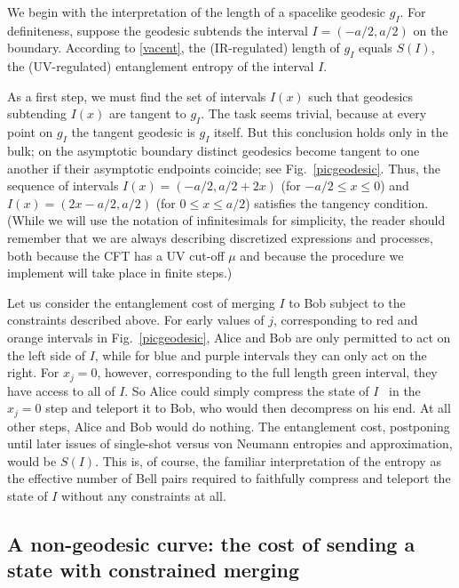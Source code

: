 \documentclass[12pt]{article}
\begin{document}
We begin with the interpretation of the length of a spacelike geodesic $g_I$. For definiteness, suppose the geodesic subtends the interval $I = (-a/2, a/2)$ on the boundary. According to \eqref{vacent}, the (IR-regulated) length of $g_I$ equals $S(I)$, the (UV-regulated) entanglement entropy of the interval $I$.

As a first step, we must find the set of intervals $I(x)$ such that geodesics subtending $I(x)$ are tangent to $g_I$. The task seems trivial, because at every point on $g_I$ the tangent geodesic is $g_I$ itself. But this conclusion holds only in the bulk; on the asymptotic boundary distinct geodesics become tangent to one another if their asymptotic endpoints coincide; see Fig.~\ref{picgeodesic}. Thus, the sequence of intervals $I(x) = (-a/2, a/2 + 2x)$ (for $-a/2 \leq x \leq 0$) and $I(x) = (2x - a/2, a/2)$ (for $0 \leq x \leq a/2$) satisfies the tangency condition. (While we will use the notation of infinitesimals for simplicity, the reader should remember that we are always describing discretized expressions and processes, both because the CFT has a UV cut-off $\mu$ and because the procedure we implement will take place in finite steps.)

Let us consider the entanglement cost of merging $I$ to Bob subject to the constraints described above. For early values of $j$, corresponding to red and orange intervals in Fig.~\ref{picgeodesic}, Alice and Bob are only permitted to act on the left side of $I$, while for blue and purple intervals they can only act on the right. For $x_j =0$, however, corresponding to the full length green interval, they have access to all of $I$. So Alice could simply compress the state of $I$~\cite{schumacher} in the $x_j=0$ step and teleport it to Bob, who would then decompress on his end. At all other steps, Alice and Bob would do nothing. The entanglement cost, postponing until later issues of single-shot versus von Neumann entropies and approximation, would be $S(I)$.  This is, of course, the familiar interpretation of the entropy as the effective number of Bell pairs required to faithfully compress and teleport the state of $I$ without any constraints at all.


\subsection{A non-geodesic curve: the cost of sending a state with constrained merging}
\label{explnongeodesic}
\end{document}
